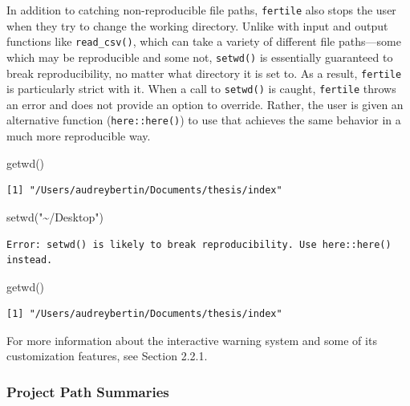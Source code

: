 \documentclass[12pt,twoside]{reedthesis}
\newenvironment{Shaded}{\begin{snugshade}}{\end{snugshade}}
\newcommand{\FunctionTok}[1]{\textcolor[rgb]{0.00,0.00,0.00}{#1}}
\newcommand{\NormalTok}[1]{#1}
\newcommand{\StringTok}[1]{\textcolor[rgb]{0.31,0.60,0.02}{#1}}
\begin{document}
In addition to catching non-reproducible file paths, \texttt{fertile} also stops the user when they try to change the working directory. Unlike with input and output functions like \texttt{read\_csv()}, which can take a variety of different file paths---some which may be reproducible and some not, \texttt{setwd()} is essentially guaranteed to break reproducibility, no matter what directory it is set to. As a result, \texttt{fertile} is particularly strict with it. When a call to \texttt{setwd()} is caught, \texttt{fertile} throws an error and does not provide an option to override. Rather, the user is given an alternative function (\texttt{here::here()}) to use that achieves the same behavior in a much more reproducible way.
\begin{Shaded}
\begin{Highlighting}[]
\FunctionTok{getwd}\NormalTok{()}
\end{Highlighting}
\end{Shaded}
\begin{verbatim}
[1] "/Users/audreybertin/Documents/thesis/index"
\end{verbatim}
\begin{Shaded}
\begin{Highlighting}[]
\FunctionTok{setwd}\NormalTok{(}\StringTok{"\textasciitilde{}/Desktop"}\NormalTok{)}
\end{Highlighting}
\end{Shaded}
\begin{verbatim}
Error: setwd() is likely to break reproducibility. Use here::here() instead.
\end{verbatim}
\begin{Shaded}
\begin{Highlighting}[]
\FunctionTok{getwd}\NormalTok{()}
\end{Highlighting}
\end{Shaded}
\begin{verbatim}
[1] "/Users/audreybertin/Documents/thesis/index"
\end{verbatim}
For more information about the interactive warning system and some of its customization features, see Section 2.2.1.

\hypertarget{project-path-summaries}{%
\subsubsection{Project Path Summaries}\label{project-path-summaries}}
\end{document}
